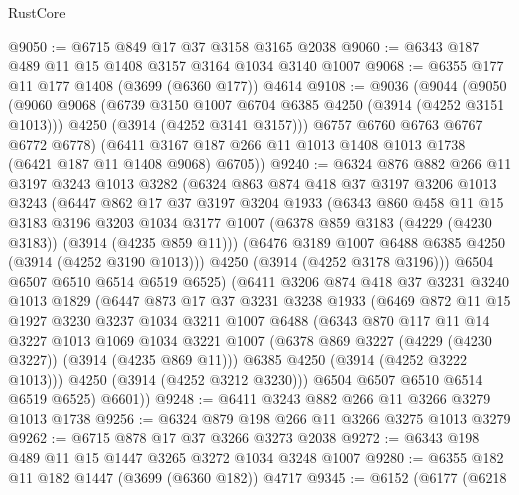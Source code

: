 \begin{lexlean}{RustCore}
\begin{coremodule}
@9050 := @6715 @849 @17 @37 @3158 @3165 @2038
@9060 := @6343 @187 @489 @11 @15 @1408 @3157 @3164 @1034 @3140 @1007
@9068 := @6355 @177 @11 @177 @1408 (@3699 (@6360 @177)) @4614
@9108 := @9036
    (@9044
      (@9050
        (@9060
          @9068
          (@6739 @3150 @1007 @6704 @6385 @4250 (@3914 (@4252 @3151 @1013)))
          @4250
          (@3914 (@4252 @3141 @3157)))
        @6757
        @6760
        @6763
        @6767
        @6772
        @6778)
      (@6411 @3167 @187 @266 @11 @1013 @1408 @1013 @1738 (@6421 @187 @11 @1408 @9068) @6705))
@9240 := @6324
    @876
    @882
    @266
    @11
    @3197
    @3243
    @1013
    @3282
    (@6324
      @863
      @874
      @418
      @37
      @3197
      @3206
      @1013
      @3243
      (@6447
        @862
        @17
        @37
        @3197
        @3204
        @1933
        (@6343
          @860
          @458
          @11
          @15
          @3183
          @3196
          @3203
          @1034
          @3177
          @1007
          (@6378 @859 @3183 (@4229 (@4230 @3183)) (@3914 (@4235 @859 @11)))
          (@6476 @3189 @1007 @6488 @6385 @4250 (@3914 (@4252 @3190 @1013)))
          @4250
          (@3914 (@4252 @3178 @3196)))
        @6504
        @6507
        @6510
        @6514
        @6519
        @6525)
      (@6411
        @3206
        @874
        @418
        @37
        @3231
        @3240
        @1013
        @1829
        (@6447
          @873
          @17
          @37
          @3231
          @3238
          @1933
          (@6469
            @872
            @11
            @15
            @1927
            @3230
            @3237
            @1034
            @3211
            @1007
            @6488
            (@6343
              @870
              @117
              @11
              @14
              @3227
              @1013
              @1069
              @1034
              @3221
              @1007
              (@6378 @869 @3227 (@4229 (@4230 @3227)) (@3914 (@4235 @869 @11)))
              @6385
              @4250
              (@3914 (@4252 @3222 @1013)))
            @4250
            (@3914 (@4252 @3212 @3230)))
          @6504
          @6507
          @6510
          @6514
          @6519
          @6525)
        @6601))
@9248 := @6411 @3243 @882 @266 @11 @3266 @3279 @1013 @1738
@9256 := @6324 @879 @198 @266 @11 @3266 @3275 @1013 @3279
@9262 := @6715 @878 @17 @37 @3266 @3273 @2038
@9272 := @6343 @198 @489 @11 @15 @1447 @3265 @3272 @1034 @3248 @1007
@9280 := @6355 @182 @11 @182 @1447 (@3699 (@6360 @182)) @4717
@9345 := @6152
    (@6177
      (@6218

\end{coremodule}
\end{lexlean}
